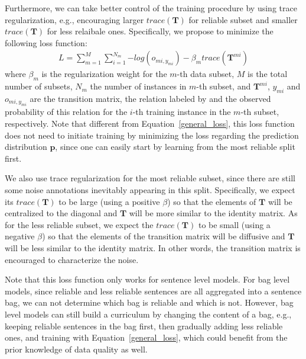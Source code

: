 Furthermore, we can take better control of the training procedure by using trace regularization, e.g., encouraging larger $trace (\mathbf{T})$ for reliable subset and smaller $trace (\mathbf{T})$ for less relaibale ones.
Specifically, we propose to minimize the following  loss function:
%
\begin{equation}
\begin{aligned}
L=\sum_{m=1}^M{\sum_{i=1}^{N_m}{-log(o_{mi,y_{mi}})}} - \beta_m trace(\mathbf{T}^{mi})
\end{aligned}
\end{equation}
where $\beta_m$ is the regularization weight for the $m$-th data subset, $M$ is the total number of subsets, $N_m$ the number of instances in $m$-th subset, and  $\mathbf{T}^{mi}$, $y_{mi}$ and $o_{mi,y_{mi}}$ are the transition matrix, the relation labeled by \DS and the observed probability of this relation for the $i$-th training instance in the $m$-th subset, respectively. Note that different from Equation~\ref{general_loss}, this loss function does not need to initiate training by
minimizing the loss regarding the prediction distribution $\mathbf{p}$, since one can easily start by learning from the most reliable split first. 


We also use trace regularization for the most reliable subset, since there are still some noise annotations inevitably appearing in this split. 
Specifically, we expect its $trace(\mathbf{T})$ to be large (using a positive $\beta$) so that the elements of $\mathbf{T}$ will be centralized to the diagonal and $\mathbf{T}$ will be more similar to the identity matrix. As for the  less reliable subset, we expect the $trace (\mathbf{T})$ to be small (using a negative $\beta$) so that the elements of the transition matrix will be diffusive and $\mathbf{T}$  will be less similar to the identity matrix. In other words, the transition matrix is encouraged to characterize the noise.

Note that this loss function only works for sentence level models. For bag level models, since reliable and less reliable sentences are all aggregated into a sentence bag,  we can not determine which bag is reliable and which is not. However, bag level models can still build a curriculum by changing the content of a bag, e.g., keeping reliable sentences in the bag first, then gradually adding less reliable ones, and training with Equation~\ref{general_loss}, which could benefit from the prior knowledge of data quality as well.




